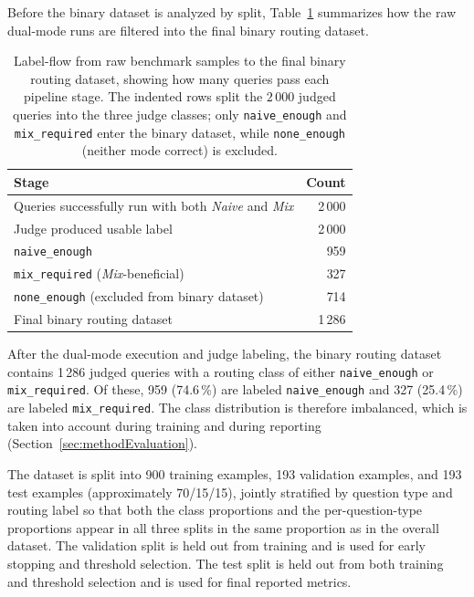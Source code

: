 \documentclass[english, bibtex]{kththesis}               %
\numberwithin{listing}{chapter}
\begin{document}
Before the binary dataset is analyzed by split, Table~\ref{tab:datasetFlow} summarizes how the raw dual-mode runs are filtered into the final binary routing dataset.

\begin{table}[!ht]
\begin{center}
\caption{Label-flow from raw benchmark samples to the final binary routing dataset, showing how many queries pass each pipeline stage. The indented rows split the $2\,000$ judged queries into the three judge classes; only \texttt{naive\_enough} and \texttt{mix\_required} enter the binary dataset, while \texttt{none\_enough} (neither mode correct) is excluded.}
\label{tab:datasetFlow}
\begin{tabular}{l|r}
\textbf{Stage} & \textbf{Count} \\
\hline
Queries successfully run with both \emph{Naive} and \emph{Mix} & 2\,000 \\
Judge produced usable label & 2\,000 \\
\quad \texttt{naive\_enough} & 959 \\
\quad \texttt{mix\_required} (\emph{Mix}-beneficial) & 327 \\
\quad \texttt{none\_enough} (excluded from binary dataset) & 714 \\
Final binary routing dataset & 1\,286 \\
\end{tabular}
\end{center}
\end{table}

After the dual-mode execution and judge labeling, the binary routing dataset contains 1\,286 judged queries with a routing class of either \texttt{naive\_enough} or \texttt{mix\_required}. Of these, 959 (74.6\,\%) are labeled \texttt{naive\_enough} and 327 (25.4\,\%) are labeled \texttt{mix\_required}. The class distribution is therefore imbalanced, which is taken into account during training and during reporting (Section~\ref{sec:methodEvaluation}).

The dataset is split into 900 training examples, 193 validation examples, and 193 test examples (approximately 70/15/15), jointly stratified by question type and routing label so that both the class proportions and the per-question-type proportions appear in all three splits in the same proportion as in the overall dataset. The validation split is held out from training and is used for early stopping and threshold selection. The test split is held out from both training and threshold selection and is used for final reported metrics.
\end{document}
